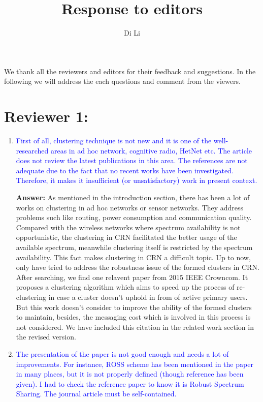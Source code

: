\documentclass[10pt,a4paper]{article}
\author{Di Li}
\title{Response to editors}
\begin{document}
We thank all the reviewers and editors for their feedback and suggestions.
In the following we will address the each questions and comment from the viewers.

\section{Reviewer 1:}

\begin{enumerate}

\item \textcolor{blue}{  First of all, clustering technique is not new and it is one of the well-researched areas in ad hoc network, cognitive radio, HetNet etc. The article does not review the latest publications in this area. The references are not adequate due to the fact that no recent works have been investigated. Therefore, it makes it insufficient (or unsatisfactory) work in present context.}

\textbf{Answer:} As mentioned in the introduction section, there has been a lot of works on clustering in ad hoc networks or sensor networks.
They address problems such like routing, power consumption and communication quality.
Compared with the wireless networks where spectrum availability is not opportunistic, the clustering in CRN facilitated the better usage of the available spectrum, meanwhile clustering itself is restricted by the spectrum availability.
This fact makes clustering in CRN a difficult topic.
Up to now, only \cite{LIU_TMC11_2, Li11_ROSS, mansoor_15_cluster_robust} have tried to address the robustness issue of the formed clusters in CRN.
After searching, we find one relavent paper \cite{Mansoor2015} from 2015 IEEE Crowncom.
It proposes a clustering algorithm which aims to speed up the process of re-clustering in case a cluster doesn't uphold in from of active primary users.
But this work doesn't consider to improve the ability of the formed clusters to maintain, besides, the messaging cost which is involved in this process is not considered.
We have included this citation in the related work section in the revised version.

 
\item \textcolor{blue}{  The presentation of the paper is not good enough and needs a lot of improvements. For instance, ROSS scheme has been mentioned in the paper in many places, but it is not properly defined (though reference has been given). I had to check the reference paper to know it is Robust Spectrum Sharing. The journal article must be self-contained.}
    

\end{enumerate}
\end{document}
